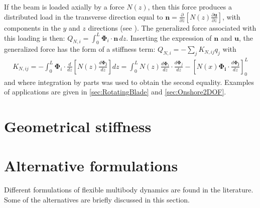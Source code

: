 \documentclass[wes, manuscript]{copernicus}
\renewcommand{\v}[1]{\boldsymbol{#1}}
\begin{document}
If the beam is loaded axially by a force $N(z)$, then this force produces a distributed load in the transverse direction equal to $\v{n} = \frac{\partial}{\partial z}\left[N(z)\frac{\partial \v{u}}{\partial z}\right]$, with components in the $y$ and $z$ directions (see \cite{branlard:2019flex}).
The generalized force associated with this loading is then: $Q_{N,i}=\int_0^L \v{\Phi}_i\cdot \v{n}\, dz$.
Inserting the expression of $\v{n}$ and $\v{u}$, the generalized force has the form of a stiffness term: $Q_{N,i} =-\sum_j K_{N,ij} q_j$ with
\begin{align}
   K_{N,ij} = -\int_0^L \v{\Phi}_i \cdot \frac{d}{d z} \left[N(z) \frac{d \v{\Phi_j}}{d z}\right] dz  
       = \int_0^L N(z) \frac{d \v{\Phi}_i }{dz}\cdot \frac{d \v{\Phi}_j }{dz} - \left[N(x) \v{\Phi_i}\cdot \frac{d\v{\Phi_j}}{dz}\right]_0^L
   \label{eq:StiffnessAxial}
\end{align}
and where integration by parts was used to obtain the second equality.
Examples of applications are given in \autoref{sec:RotatingBlade} and \autoref{sec:Onshore2DOF}.




\section{Geometrical stiffness}




\section{Alternative formulations}
\label{sec:AlternativeFormulations}
\label{sec:TaylorExpansion}

Different formulations of flexible multibody dynamics are found in the literature.
Some of the alternatives are briefly discussed in this section.
\end{document}

